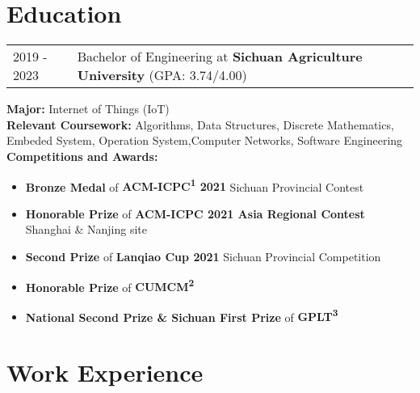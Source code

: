 \documentclass[a4paper,12pt,UTF8]{article}
\begin{document}
\section{Education}
\begin{tabularx}{\linewidth}{@{}l X@{}}	
2019 - 2023 & ​​Bachelor of Engineering​​ at \textbf{Sichuan Agriculture University} \hfill (GPA: 3.74/4.00) \\ 
\end{tabularx}
\textbf{Major:} Internet of Things (IoT)\\
\textbf{Relevant Coursework:} Algorithms, Data Structures, Discrete Mathematics, Embeded System, 
Operation System,Computer Networks, Software Engineering\\
\textbf{Competitions and Awards:}
\begin{itemize} [nosep]
    \item \textbf{Bronze Medal} of  \textbf{​ACM-ICPC\textsuperscript{1} 2021​} Sichuan Provincial Contest
    \item \textbf{Honorable Prize} of \textbf{ACM-ICPC 2021 Asia Regional Contest} Shanghai \& Nanjing site
    \item \textbf{Second Prize} of \textbf{Lanqiao Cup 2021} Sichuan Provincial Competition
    \item \textbf{Honorable Prize} of \textbf{CUMCM\textsuperscript{2}}
    \item \textbf{National Second Prize \& Sichuan First Prize} of \textbf{GPLT\textsuperscript{3}}
\end{itemize}




\section{Work Experience}
\end{document}
